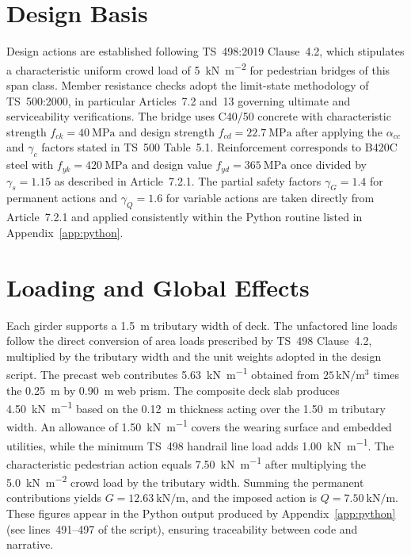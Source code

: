 \documentclass[12pt,a4paper]{report}
\begin{document}
\section{Design Basis}
Design actions are established following TS~498:2019 Clause~4.2, which stipulates a characteristic uniform crowd load of \SI{5}{\kilo\newton\per\square\meter} for pedestrian bridges of this span class. Member resistance checks adopt the limit-state methodology of TS~500:2000, in particular Articles~7.2 and~13 governing ultimate and serviceability verifications. The bridge uses C40/50 concrete with characteristic strength $f_{ck}=\SI{40}{\mega\pascal}$ and design strength $f_{cd}=\SI{22.7}{\mega\pascal}$ after applying the $\alpha_{cc}$ and $\gamma_c$ factors stated in TS~500 Table~5.1. Reinforcement corresponds to B420C steel with $f_{yk}=\SI{420}{\mega\pascal}$ and design value $f_{yd}=\SI{365}{\mega\pascal}$ once divided by $\gamma_s=1.15$ as described in Article~7.2.1. The partial safety factors $\gamma_G = 1.4$ for permanent actions and $\gamma_Q = 1.6$ for variable actions are taken directly from Article~7.2.1 and applied consistently within the Python routine listed in Appendix~\ref{app:python}.

\section{Loading and Global Effects}
Each girder supports a \SI{1.5}{\meter} tributary width of deck. The unfactored line loads follow the direct conversion of area loads prescribed by TS~498 Clause~4.2, multiplied by the tributary width and the unit weights adopted in the design script. The precast web contributes \SI{5.63}{\kilo\newton\per\meter} obtained from $25\,\mathrm{kN/m^3}$ times the \SI{0.25}{\meter} by \SI{0.90}{\meter} web prism. The composite deck slab produces \SI{4.50}{\kilo\newton\per\meter} based on the \SI{0.12}{\meter} thickness acting over the \SI{1.50}{\meter} tributary width. An allowance of \SI{1.50}{\kilo\newton\per\meter} covers the wearing surface and embedded utilities, while the minimum TS~498 handrail line load adds \SI{1.00}{\kilo\newton\per\meter}. The characteristic pedestrian action equals \SI{7.50}{\kilo\newton\per\meter} after multiplying the \SI{5.0}{\kilo\newton\per\square\meter} crowd load by the tributary width. Summing the permanent contributions yields $G = \SI{12.63}{\kilo\newton\per\meter}$, and the imposed action is $Q = \SI{7.50}{\kilo\newton\per\meter}$. These figures appear in the Python output produced by Appendix~\ref{app:python} (see lines~491--497 of the script), ensuring traceability between code and narrative.
\end{document}
